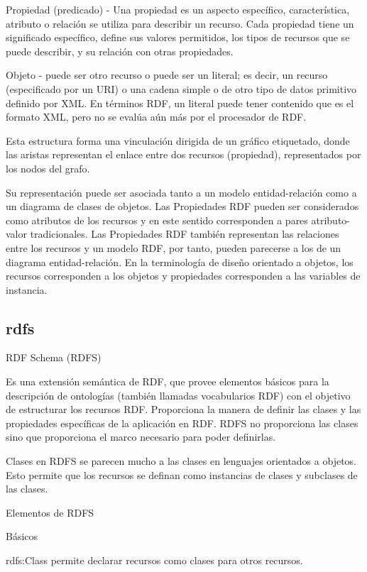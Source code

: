 Propiedad (predicado) - Una propiedad es un aspecto específico, característica, atributo o relación se utiliza para describir un recurso. 
Cada propiedad tiene un significado específico, define sus valores permitidos, los tipos de recursos que se puede describir, 
y su relación con otras propiedades. 

Objeto - puede ser otro recurso o puede ser un literal; es decir, un recurso (especificado por un URI) o una cadena simple o 
de otro tipo de datos primitivo definido por XML. En términos RDF, un literal puede tener contenido que es el formato XML,
pero no se evalúa aún más por el procesador de RDF.

Esta estructura forma una vinculación dirigida de un gráfico etiquetado, donde las aristas representan el enlace entre dos 
recursos (propiedad), representados por los nodos del grafo.

Su representación puede ser asociada tanto a un modelo entidad-relación como a un diagrama de clases de objetos.
Las Propiedades RDF pueden ser considerados como atributos de los recursos y en este sentido corresponden a pares 
atributo-valor tradicionales. Las Propiedades RDF también representan las relaciones entre los recursos y un modelo RDF,
por tanto, pueden parecerse a los de un diagrama entidad-relación.
En la terminología de diseño orientado a objetos, los recursos corresponden a los objetos y propiedades 
corresponden a las variables de instancia.

\subsection{rdfs}
RDF Schema (RDFS)

Es una extensión semántica de RDF, que provee elementos básicos para la descripción de ontologías (también llamadas vocabularios RDF) con el objetivo
de estructurar los recursos RDF. Proporciona la manera de definir las clases y las propiedades específicas de la aplicación en RDF.
RDFS no proporciona las clases sino que proporciona el marco necesario para poder definirlas.

Clases en RDFS se parecen mucho a las clases en lenguajes orientados a objetos. Esto permite que los recursos se definan como 
instancias de clases y subclases de las clases.

Elementos de RDFS

Básicos

    rdfs:Class permite declarar recursos como clases para otros recursos. 
    
